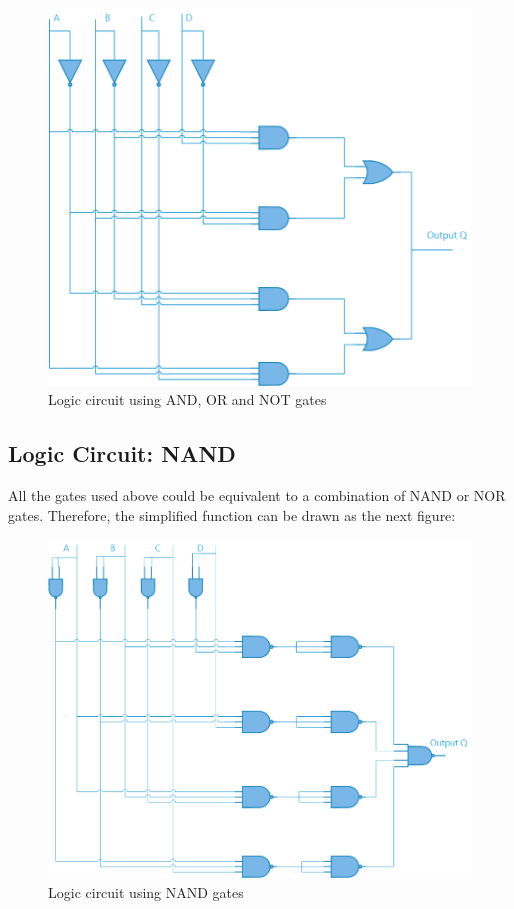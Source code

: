     \begin{figure}[htb!]
        \centering
        \includegraphics[scale=0.45]{../E2TP1/normallogic.png}
        \caption{\color{cyan}Logic circuit using AND, OR and NOT gates}
        \label{fig:normllogic}
    \end{figure}

    \pagebreak

    \subsection{\color{purple}Logic Circuit: NAND}

    All the gates used above could be equivalent to a combination of NAND or NOR gates. Therefore, the simplified function can be drawn as the next figure:

    \begin{figure}[h!]
        \centering
        \includegraphics[scale=0.45]{../E2TP1/nandlogic.png}
        \caption{\color{cyan}Logic circuit using NAND gates}
        \label{fig:nandlogic}
    \end{figure}

